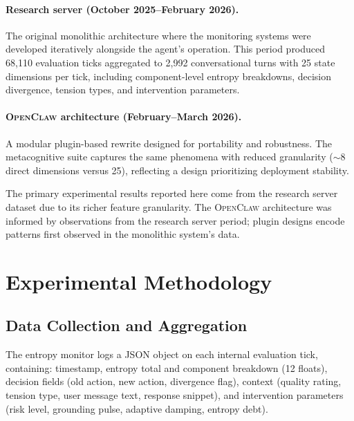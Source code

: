 \documentclass[twoside,11pt]{article}
\newcommand{\fw}{\textsc{OpenClaw}}
\begin{document}
\paragraph{Research server (October 2025--February 2026).} The original
monolithic architecture where the monitoring systems were developed iteratively
alongside the agent's operation. This period produced 68,110 evaluation ticks
aggregated to 2,992 conversational turns with 25 state dimensions per tick,
including component-level entropy breakdowns, decision divergence, tension
types, and intervention parameters.

\paragraph{\fw{} architecture (February--March 2026).} A modular plugin-based
rewrite designed for portability and robustness. The metacognitive suite
captures the same phenomena with reduced granularity ($\sim$8 direct dimensions
versus 25), reflecting a design prioritizing deployment stability.

The primary experimental results reported here come from the research server
dataset due to its richer feature granularity. The \fw{} architecture was
informed by observations from the research server period; plugin designs encode
patterns first observed in the monolithic system's data.


\section{Experimental Methodology}
\label{sec:methodology}

\subsection{Data Collection and Aggregation}
\label{sec:method-data}

The entropy monitor logs a JSON object on each internal evaluation tick,
containing: timestamp, entropy total and component breakdown (12 floats),
decision fields (old action, new action, divergence flag), context (quality
rating, tension type, user message text, response snippet), and intervention
parameters (risk level, grounding pulse, adaptive damping, entropy debt).
\end{document}
